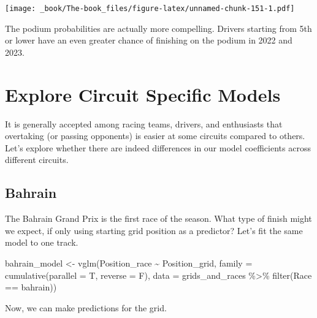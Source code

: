 \documentclass[
]{book}
\newenvironment{Shaded}{\begin{snugshade}}{\end{snugshade}}
\newcommand{\AttributeTok}[1]{\textcolor[rgb]{0.77,0.63,0.00}{#1}}
\newcommand{\FunctionTok}[1]{\textcolor[rgb]{0.00,0.00,0.00}{#1}}
\newcommand{\NormalTok}[1]{#1}
\newcommand{\OtherTok}[1]{\textcolor[rgb]{0.56,0.35,0.01}{#1}}
\newcommand{\SpecialCharTok}[1]{\textcolor[rgb]{0.00,0.00,0.00}{#1}}
\newcommand{\StringTok}[1]{\textcolor[rgb]{0.31,0.60,0.02}{#1}}
\begin{document}
\texttt{[image: \_book/The-book\_files/figure-latex/unnamed-chunk-151-1.pdf]}

The podium probabilities are actually more compelling. Drivers starting from 5th or lower have an even greater chance of finishing on the podium in 2022 and 2023.

\hypertarget{explore-circuit-specific-models}{%
\section{Explore Circuit Specific Models}\label{explore-circuit-specific-models}}

It is generally accepted among racing teams, drivers, and enthusiasts that overtaking (or passing opponents) is easier at some circuits compared to others. Let's explore whether there are indeed differences in our model coefficients across different circuits.

\hypertarget{bahrain}{%
\subsection{Bahrain}\label{bahrain}}

The Bahrain Grand Prix is the first race of the season. What type of finish might we expect, if only using starting grid position as a predictor? Let's fit the same model to one track.

\begin{Shaded}
\begin{Highlighting}[]
\NormalTok{bahrain\_model }\OtherTok{\textless{}{-}} \FunctionTok{vglm}\NormalTok{(Position\_race }\SpecialCharTok{\textasciitilde{}}\NormalTok{ Position\_grid, }
                      \AttributeTok{family =} \FunctionTok{cumulative}\NormalTok{(}\AttributeTok{parallel =}\NormalTok{ T, }\AttributeTok{reverse =}\NormalTok{ F),}
                      \AttributeTok{data =}\NormalTok{ grids\_and\_races }\SpecialCharTok{\%\textgreater{}\%}
                       \FunctionTok{filter}\NormalTok{(Race }\SpecialCharTok{==} \StringTok{\textquotesingle{}bahrain\textquotesingle{}}\NormalTok{))}
\end{Highlighting}
\end{Shaded}

Now, we can make predictions for the grid.
\end{document}
